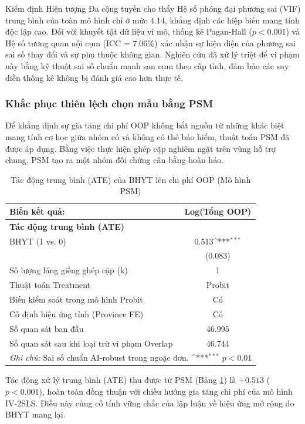 \documentclass[12pt,a4paper]{article}
\begin{document}
Kiểm định Hiện tượng Đa cộng tuyến cho thấy Hệ số phóng đại phương sai (VIF) trung bình của toàn mô hình chỉ ở mức $4.14$, khẳng định các hiệp biến mang tính độc lập cao. Đối với khuyết tật dữ liệu vi mô, thống kê Pagan-Hall ($p < 0.001$) và Hệ số tương quan nội cụm (ICC = $7.06\%$) xác nhận sự hiện diện của phương sai sai số thay đổi và sự phụ thuộc không gian. Nghiên cứu đã xử lý triệt để vi phạm này bằng kỹ thuật sai số chuẩn mạnh san cụm theo cấp tỉnh, đảm bảo các suy diễn thống kê không bị đánh giá cao hơn thực tế.

\subsubsection{Khắc phục thiên lệch chọn mẫu bằng PSM}
Để khẳng định sự gia tăng chi phí OOP không bắt nguồn từ những khác biệt mang tính cơ học giữa nhóm có và không có thẻ bảo hiểm, thuật toán PSM đã được áp dụng. Bằng việc thực hiện ghép cặp nghiêm ngặt trên vùng hỗ trợ chung, PSM tạo ra một nhóm đối chứng cân bằng hoàn hảo. 

\begin{table}[htbp]
	\centering
	\def\sym#1{\ifmmode^{#1}\else\(^{#1}\)\fi}
	\caption{Tác động trung bình (ATE) của BHYT lên chi phí OOP (Mô hình PSM)}
	\label{tab:psm_results}
	\begin{tabular}{lc}
		\toprule
		\textbf{Biến kết quả:} & \textbf{Log(Tổng OOP)} \\
		\midrule
		\textbf{Tác động trung bình (ATE)} & \\
		BHYT (1 vs. 0) & 0.513\sym{***} \\
		& (0.083) \\
		\midrule
		Số lượng láng giềng ghép cặp (k) & 1 \\
		Thuật toán Treatment & Probit \\
		Biến kiểm soát trong mô hình Probit & Có \\
		Cố định hiệu ứng tỉnh (Province FE) & Có \\
		\midrule
		Số quan sát ban đầu & 46.995 \\
		Số quan sát sau khi loại trừ vi phạm Overlap & 46.744 \\
		\bottomrule
		\multicolumn{2}{p{10cm}}{\footnotesize \textit{Ghi chú:} Sai số chuẩn AI-robust trong ngoặc đơn. \sym{***} \(p<0.01\)}
	\end{tabular}
\end{table}

Tác động xử lý trung bình (ATE) thu được từ PSM (Bảng \ref{tab:psm_results}) là $+0.513$ ($p<0.001$), hoàn toàn đồng thuận với chiều hướng gia tăng chi phí của mô hình IV-2SLS. Điều này củng cố tính vững chắc của lập luận về hiệu ứng mở rộng do BHYT mang lại.
\end{document}
